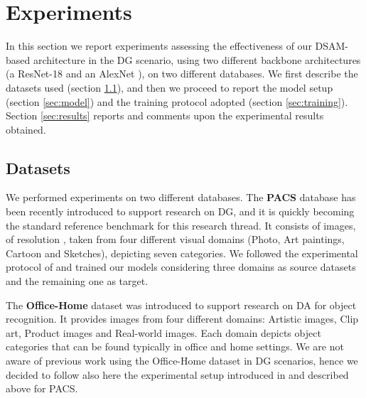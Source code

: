 \section{Experiments}
\label{sec:expers}

In this section we report experiments assessing the effectiveness of our DSAM-based architecture in the DG scenario, using two different backbone architectures (a ResNet-18 \cite{he2016deep} and an AlexNet \cite{krizhevsky2012imagenet}), on two different databases. We first describe the datasets used (section \ref{sec:dataset}), and then we proceed to report the model setup (section \ref{sec:model}) and the training protocol adopted (section \ref{sec:training}). Section \ref{sec:results} reports and comments upon the experimental results obtained.

    \subsection{Datasets}
    \label{sec:dataset}

We performed experiments on two different databases. The \textbf{PACS} database \cite{li2017deeper} has been recently introduced to support research on DG, and it is quickly becoming the standard reference benchmark for this research thread. It consists of  images, of resolution , taken from four different visual domains (Photo, Art paintings, Cartoon and Sketches), depicting seven categories. We followed the experimental protocol of \cite{li2017deeper} and trained our models considering three domains as source datasets and the remaining one as target.

The \textbf{Office-Home} dataset \cite{venkateswara2017Deep} was introduced to support research on DA for object recognition. It provides images from four different domains: Artistic images, Clip art, Product images and Real-world images. Each domain depicts  object categories that can be found typically in office and home settings. We are not aware of previous work using the Office-Home dataset in DG scenarios, hence we decided to follow also here the experimental setup introduced in \cite{li2017deeper} and described above for PACS.

